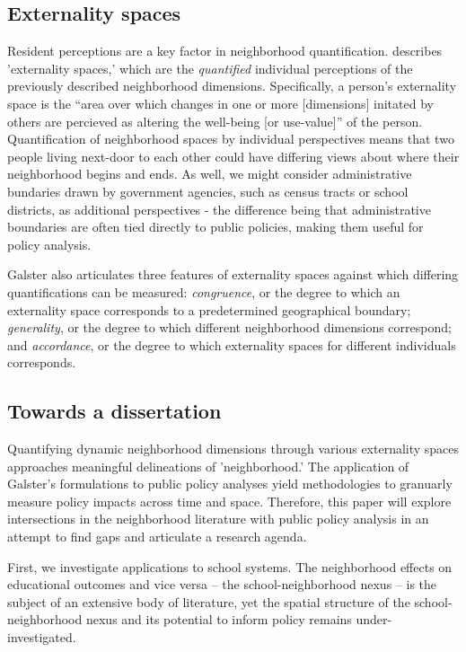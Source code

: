 \subsection{Externality spaces}
Resident perceptions are a key factor in neighborhood quantification.
\cite{galster1986WhatNeighbourhood} describes 'externality spaces,'
which are the \emph{quantified} individual perceptions of the
previously described neighborhood dimensions. Specifically, a person's
externality space is the ``area over which changes in one or more
[dimensions] initated by others are percieved as altering the
well-being [or use-value]'' of the
person. \cite{galster2001NatureNeighbourhood} Quantification of
neighborhood spaces by individual perspectives means that two people
living next-door to each other could have differing views about where
their neighborhood begins and ends. As well, we might consider
administrative bundaries drawn by government agencies, such as census
tracts or school districts, as additional perspectives - the
difference being that administrative boundaries are often tied
directly to public policies, making them useful for policy analysis.

Galster also articulates three features of externality spaces against
which differing quantifications can be measured: \emph{congruence}, or
the degree to which an externality space corresponds to a
predetermined geographical boundary; \emph{generality}, or the degree
to which different neighborhood dimensions correspond; and
\emph{accordance}, or the degree to which externality spaces for
different individuals corresponds.

\subsection{Towards a dissertation}
Quantifying dynamic neighborhood dimensions through various
externality spaces approaches meaningful delineations of
'neighborhood.' The application of Galster's formulations to public
policy analyses yield methodologies to granuarly measure policy
impacts across time and space. Therefore, this paper will explore
intersections in the neighborhood literature with public policy
analysis in an attempt to find gaps and articulate a research agenda.

First, we investigate applications to school systems. The neighborhood
effects on educational outcomes and vice versa -- the
school-neighborhood nexus -- is the subject of an extensive body of
literature, yet the spatial structure of the school-neighborhood nexus
and its potential to inform policy remains under-investigated.

